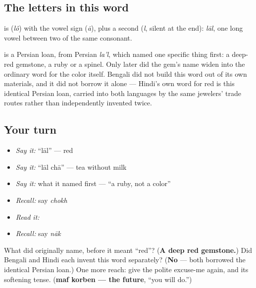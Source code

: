 \subsection*{The letters in this word}
\textbf{} is \textbf{} (\emph{lô}) with the vowel sign \textbf{} (\emph{ā}), plus a second \textbf{} (\emph{l}, silent at the end): \emph{lāl}, one long vowel between two of the same consonant.

\begin{cousinweb}
\textbf{} is a Persian loan, from Persian \emph{la'l}, which named one specific thing first: a deep-red gemstone, a ruby or a spinel. Only later did the gem's name widen into the ordinary word for the color itself. Bengali did not build this word out of its own materials, and it did not borrow it alone — Hindi's own word for red is this identical Persian loan, carried into both languages by the same jewelers' trade routes rather than independently invented twice.
\end{cousinweb}

\subsection*{Your turn}
\begin{itemize}
\raggedright
  \item \emph{Say it:} \textquotedblleft{}lāl\textquotedblright{} — red
  \item \emph{Say it:} \textquotedblleft{}lāl chā\textquotedblright{} — tea without milk
  \item \emph{Say it:} what it named first — \textquotedblleft{}a ruby, not a color\textquotedblright{}
  \item \emph{Recall:} say \emph{chokh}
  \item \emph{Read it:} \textbf{}
  \item \emph{Recall:} say \emph{nāk}
\end{itemize}

\begin{tcolorbox}[breakable,colback=teal!4,colframe=teal!35!black,title={Before you move on}]
What did  originally name, before it meant \textquotedblleft{}red\textquotedblright{}? (\textbf{A deep red gemstone.}) Did Bengali and Hindi each invent this word separately? (\textbf{No} — both borrowed the identical Persian loan.) One more reach: give the polite excuse-me again, and its softening tense. (\textbf{maf korben — the future}, \textquotedblleft{}you will do.\textquotedblright{})
\end{tcolorbox}
